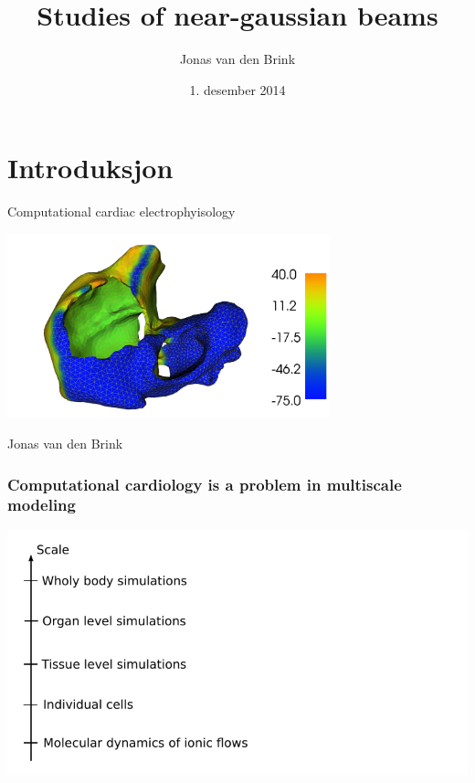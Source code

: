 \documentclass[norsk, 12pt]{beamer}
\title{Studies of near-gaussian beams}
\author{Jonas van den Brink}
\institute{}
\date{1. desember 2014}
\begin{document}
\pagestyle{empty}

\section{Introduksjon}

\begin{frame}[fragile]
\begin{center}	
{\Huge \color{DarkFern} Computational cardiac electrophyisology}
\begin{center}
\vspace{0.1cm}
\includegraphics[width=0.7\textwidth]{snapshot3.png}
\vspace{0.1cm}
\end{center}
{\centering \color{Charcoal} Jonas van den Brink}
\end{center}
\end{frame}

\begin{frame}[fragile]
\frametitle{Computational cardiology is a problem in multiscale modeling}
\begin{center}
\includegraphics[width=\textwidth]{multiscale0.pdf}
\end{center}
\end{frame}
\end{document}
